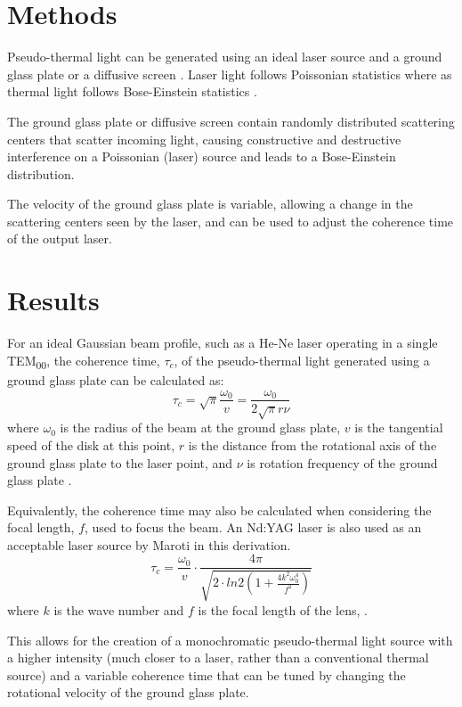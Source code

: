 \documentclass{article}
\begin{document}
\section{Methods}

Pseudo-thermal light can be generated using an ideal laser source and a ground glass plate or a diffusive screen \cite{Ndersson2017}. Laser light follows Poissonian statistics where as thermal light follows Bose-Einstein statistics \cite{Grider1996}.

The ground glass plate or diffusive screen contain randomly distributed scattering centers that scatter incoming light, causing constructive and destructive interference on a Poissonian (laser) source and leads to a Bose-Einstein distribution.

The velocity of the ground glass plate is variable, allowing a change in the scattering centers seen by the laser, and can be used to adjust the coherence time of the output laser.

\section{Results}

For an ideal Gaussian beam profile, such as a He-Ne laser operating in a single
TEM\textsubscript{00}, the coherence time, $\tau_c$, of the pseudo-thermal light
generated using a ground glass plate can be calculated as:
\begin{equation}
  \tau_{c} = \sqrt{\pi}\frac{\omega_0}{v} = \frac{\omega_0}{2\sqrt{\pi}r\nu}
\label{eq1}\end{equation}
where $\omega_0$ is the radius of the beam at the ground glass plate, $v$ is the tangential
speed of the disk at this point, $r$ is the distance from the rotational axis of the ground glass plate
to the laser point, and $\nu$ is rotation frequency of the ground glass plate \cite{Lutz}.

Equivalently, the coherence time may also be calculated when considering the
focal length, $f$, used to focus the beam. An Nd:YAG laser is also used as an acceptable
laser source by Maroti in this derivation.
\begin{equation}
  \tau_{c} = \frac{\omega_{0}}{v} \cdot \frac{4\pi}{\sqrt{2\cdot ln 2 (1 + \frac{4 k^2 \omega_0^4}{f^2})}}
\label{eq2}\end{equation}
where $k$ is the wave number and $f$ is the focal length of the lens, \cite{Maroti2013}.

This allows for the creation of a monochromatic pseudo-thermal light source with
a higher intensity (much closer to a laser, rather than a conventional thermal source)
and a variable coherence time that can be tuned by changing the rotational velocity of the ground glass plate.
\end{document}
